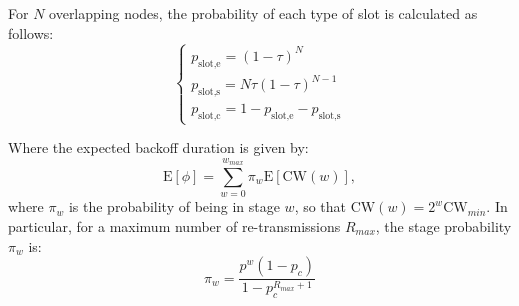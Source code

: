\documentclass[conference]{IEEEtran}
\theoremstyle{definition}
\begin{document}
For $N$ overlapping nodes, the probability of each type of slot is calculated as follows:
\begin{equation}
    \begin{cases}
       p_{\text{slot,e}}=(1-\tau)^N\\
       p_{\text{slot,s}}=N\tau(1-\tau)^{N-1}\\
       p_{\text{slot,c}}=1-p_\text{slot,e}-p_\text{slot,s}
   \end{cases} 
\end{equation}

Where the expected backoff duration is given by:
\begin{equation}
   \text{E}[\phi] = \sum_{w=0}^{w_{max}} \pi_w \text{E}[\text{CW}(w)],
\end{equation}
where $\pi_w$ is the probability of being in stage $w$, so that $\text{CW}(w) = 2^w \text{CW}_{min}$. In particular, for a maximum number of re-transmissions $R_{max}$, the stage probability $\pi_w$ is:
\begin{equation}
\pi_w = \frac{p^w(1-p_c)}{1-p_c^{R_{max}+1}}
\end{equation}

\ifCLASSOPTIONcaptionsoff
\newpage
\fi



\end{document}
